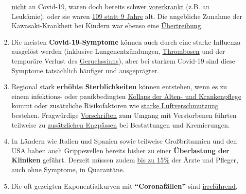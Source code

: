 \begin{enumerate}
  \href{https://www.dailymail.co.uk/news/article-8193487/Coroner-refuses-rule-COVID-19-cause-death-six-week-old-Connecticut-baby.html}{nicht}
  an Covid-19, waren doch bereits schwer
  \href{https://sports.yahoo.com/spanish-football-coach-francisco-garcia-163153573.html}{vorerkrankt}
  (z.B. an Leukämie), oder sie waren
  \href{https://www.n-tv.de/panorama/Neunjaehrige-Corona-Tote-war-109-Jahre-alt-article21753784.html}{109
  statt 9 Jahre} alt. Die angebliche Zunahme der Kawasaki-Krankheit bei
  Kindern war ebenso eine
  \href{https://www.societi.org.uk/kawasaki-disease-covid-19/responding-to-press-coverage-28-april-2020/}{Übertreibung}.
\item
  Die meisten \textbf{Covid-19-Symptome} können auch durch eine starke
  Influenza ausgelöst werden (inklusive Lungen­ent­zündungen,
  \href{https://www.sciencedaily.com/releases/2009/10/091014111549.htm}{Thrombosen}
  und der temporäre Verlust des
  \href{https://pubmed.ncbi.nlm.nih.gov/23948436/}{Geruchssinns}), aber
  bei starkem Covid-19 sind diese Symptome tatsächlich häufiger und
  ausgeprägter.
\item
  Regional stark \textbf{erhöhte Sterblichkeiten} können entstehen, wenn
  es zu einem infektions- oder panikbedingten
  \href{https://swprs.org/covid19-bericht-aus-italien/}{Kollaps der
  Alten- und Krankenpflege} kommt oder zusätzliche Risikofaktoren wie
  \href{https://www.heise.de/tp/features/Feinstaubpartikel-als-Viren-Vehikel-4687454.html}{starke
  Luftverschmutzung} bestehen. Fragwürdige
  \href{https://www.ecdc.europa.eu/sites/default/files/documents/COVID-19-safe-handling-of-bodies-or-persons-dying-from-COVID19.pdf}{Vorschriften}
  zum Umgang mit Verstorbenen führten teilweise zu
  \href{https://www.globalresearch.ca/truth-behind-refrigerated-morgue-truck-stories/5711475}{zusätzlichen
  Engpässen} bei Bestattungen und Kremierungen.
\item
  In Ländern wie Italien und Spanien sowie teilweise Großbritannien und
  den USA haben
  \href{https://off-guardian.org/2020/04/02/coronavirus-fact-check-1-flu-doesnt-overwhelm-our-hospitals/}{auch
  Grippewellen} bereits bisher zu einer \textbf{Überlastung der
  Kliniken} geführt. Derzeit müssen zudem
  \href{https://www.nytimes.com/2020/03/24/world/europe/coronavirus-europe-covid-19.html}{bis
  zu 15\%} der Ärzte und Pfleger, auch ohne Symptome, in Quarantäne.
\item
  Die oft gezeigten Exponentialkurven mit \textbf{``Coronafällen''} sind
  \href{https://multipolar-magazin.de/artikel/coronavirus-irrefuhrung-fallzahlen}{irreführend},

\end{enumerate}
